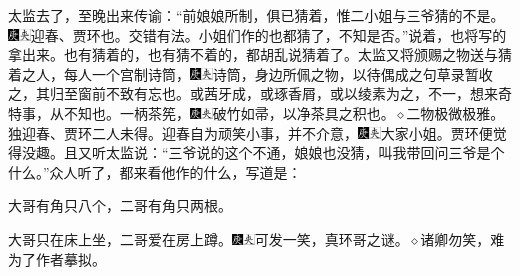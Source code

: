 太监去了，至晚出来传谕：“前娘娘所制，俱已猜着，惟二小姐与三爷猜的不是。{\includegraphics[width=3mm]{../Images/00004}\includegraphics[width=3mm]{../Images/00012}\footnotesize \kaishu 迎春、贾环也。交错有法。}小姐们作的也都猜了，不知是否。”说着，也将写的拿出来。也有猜着的，也有猜不着的，都胡乱说猜着了。太监又将颁赐之物送与猜着之人，每人一个宫制诗筒，{\includegraphics[width=3mm]{../Images/00004}\includegraphics[width=3mm]{../Images/00012}\footnotesize \kaishu 诗筒，身边所佩之物，以待偶成之句草录暂收之，其归至窗前不致有忘也。或茜牙成，或琢香屑，或以绫素为之，不一，想来奇特事，从不知也。}一柄茶筅，{\includegraphics[width=3mm]{../Images/00004}\includegraphics[width=3mm]{../Images/00012}\footnotesize \kaishu 破竹如帚，以净茶具之积也。{$\diamond$}二物极微极雅。}独迎春、贾环二人未得。迎春自为顽笑小事，并不介意，{\includegraphics[width=3mm]{../Images/00004}\includegraphics[width=3mm]{../Images/00012}\footnotesize \kaishu 大家小姐。}贾环便觉得没趣。且又听太监说：“三爷说的这个不通，娘娘也没猜，叫我带回问三爷是个什么。”众人听了，都来看他作的什么，写道是：

大哥有角只八个，二哥有角只两根。

大哥只在床上坐，二哥爱在房上蹲。{\includegraphics[width=3mm]{../Images/00004}\includegraphics[width=3mm]{../Images/00012}\footnotesize \kaishu 可发一笑，真环哥之谜。{$\diamond$}诸卿勿笑，难为了作者摹拟。}

